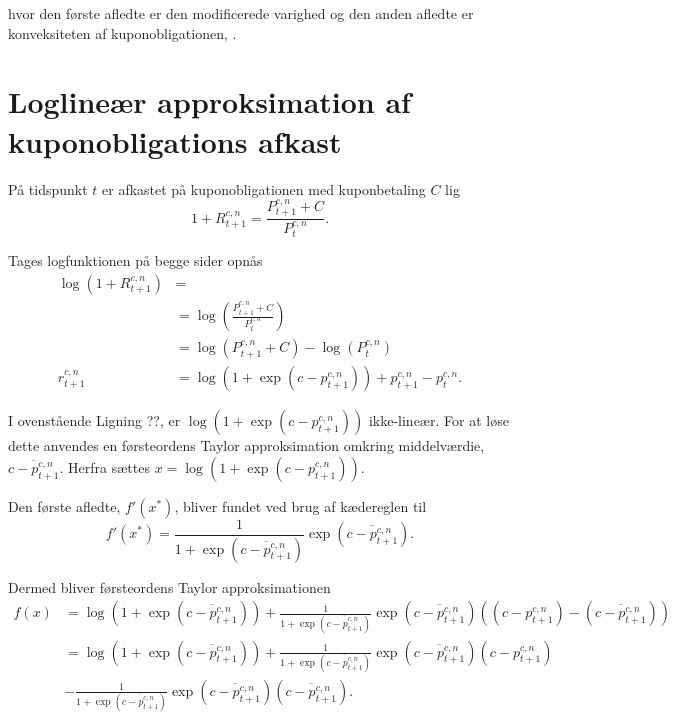 \documentclass[
  a4paper,
  oneside]{memoir}
\begin{document}
hvor den første afledte er den modificerede varighed og den anden afledte er konveksiteten af kuponobligationen, \citep{Campbell1997}.

\hypertarget{loglineuxe6r-approksimation-af-kuponobligations-afkast}{%
\section{Loglineær approksimation af kuponobligations afkast}\label{loglineuxe6r-approksimation-af-kuponobligations-afkast}}

På tidspunkt \(t\) er afkastet på kuponobligationen med kuponbetaling \(C\) lig
\begin{equation}
1+R_{t+1}^{c,n}=\frac{P_{t+1}^{c,n} + C}{P_t^{c,n}}.
\end{equation}

Tages logfunktionen på begge sider opnås
\begin{align}
\log\left(1+R_{t+1}^{c,n}\right)&=\\
&=\log\left(\frac{P_{t+1}^{c,n} + C}{P_t^{c,n}}\right)\\
&=\log\left(P_{t+1}^{c,n} + C\right) - \log\left(P_t^{c,n}\right)\\
r_{t+1}^{c,n}&=\log\left(1+\exp\left(c- p_{t+1}^{c,n}\right)\right) + p_{t+1}^{c,n} - p_t^{c,n}.
\end{align}

I ovenstående Ligning ??, er \(\log\left(1+\exp\left(c- p_{t+1}^{c,n}\right)\right)\) ikke-lineær. For at løse dette anvendes en førsteordens Taylor approksimation omkring middelværdie, \(\overline{c- p_{t+1}^{c,n}}\). Herfra sættes \(x=\log\left(1+\exp\left(c- p_{t+1}^{c,n}\right)\right)\).

Den første afledte, \(f'\left(x^*\right)\), bliver fundet ved brug af kædereglen til
\[f'\left(x^*\right)=\frac{1}{1+\exp\left(\overline{c- p_{t+1}^{c,n}}\right)}\exp\left(\overline{c- p_{t+1}^{c,n}}\right).\]

Dermed bliver førsteordens Taylor approksimationen
\begin{align}
f\left(x\right)&=\log\left(1+\exp\left(\overline{c- p_{t+1}^{c,n}}\right)\right)+ \frac{1}{1+\exp\left(\overline{c- p_{t+1}^{c,n}}\right)}\exp\left(\overline{c- p_{t+1}^{c,n}}\right) \left(\left(c-p_{t+1}^{c,n}\right) -\left(\overline{c- p_{t+1}^{c,n}}\right)\right)\\
&=\log\left(1+\exp\left(\overline{c- p_{t+1}^{c,n}}\right)\right) + \frac{1}{1+\exp\left(\overline{c- p_{t+1}^{c,n}}\right)}\exp\left(\overline{c- p_{t+1}^{c,n}}\right) \left(c-p_{t+1}^{c,n}\right)\\
\quad&- \frac{1}{1+\exp\left(\overline{c- p_{t+1}^{c,n}}\right)}\exp\left(\overline{c- p_{t+1}^{c,n}}\right)\left(\overline{c- p_{t+1}^{c,n}}\right).
\end{align}
\end{document}
